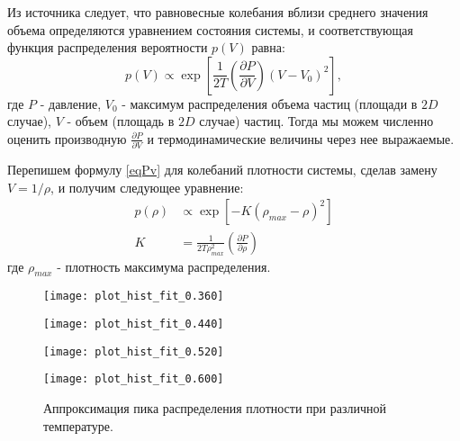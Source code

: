 Из источника \cite{Landau} следует, что равновесные колебания вблизи среднего значения объема определяются уравнением состояния системы, и соответствующая функция распределения вероятности $p(V)$ равна:
\begin{equation}
p(V) \varpropto \exp\left[ \frac{1}{2T} \left( \frac{\partial P}{\partial V} \right)  \left(V - V_0 \right)^2 \right],
\label{eqPv}
\end{equation}
где $P$ - давление, $V_0$ - максимум распределения объема частиц (площади в $2D$ случае), $V$ - объем (площадь в $2D$ случае) частиц.
Тогда мы можем численно оценить производную $\frac{\partial P}{\partial V}$ и термодинамические величины через нее выражаемые.

Перепишем формулу \ref{eqPv} для колебаний плотности системы, сделав замену $V = 1 / \rho$, и получим следующее уравнение:
\begin{equation}
\begin{aligned}
p(\rho) &\varpropto \exp \left[ - K \left(\rho_{max}- \rho \right)^2 \right] \\
K &= \frac{1}{2T\rho_{max}^2} \left( \frac{\partial P}{\partial \rho} \right)
\end{aligned}
\label{eqFitRho}
\end{equation}
где $\rho_{max}$ - плотность максимума распределения.

\begin{figure}[htbp!]
\begin{center}
\begin{minipage}[h]{0.45\linewidth}
\texttt{[image: plot\_hist\_fit\_0.360]}
\end{minipage}
\begin{minipage}[h]{0.45\linewidth}
\texttt{[image: plot\_hist\_fit\_0.440]}
\end{minipage}

\begin{minipage}[h]{0.45\linewidth}
\texttt{[image: plot\_hist\_fit\_0.520]}
\end{minipage}
\begin{minipage}[h]{0.45\linewidth}
\texttt{[image: plot\_hist\_fit\_0.600]}
\end{minipage}
\caption{Аппроксимация пика распределения плотности при различной температуре.}
\label{risHistFit}
\end{center}
\end{figure}

